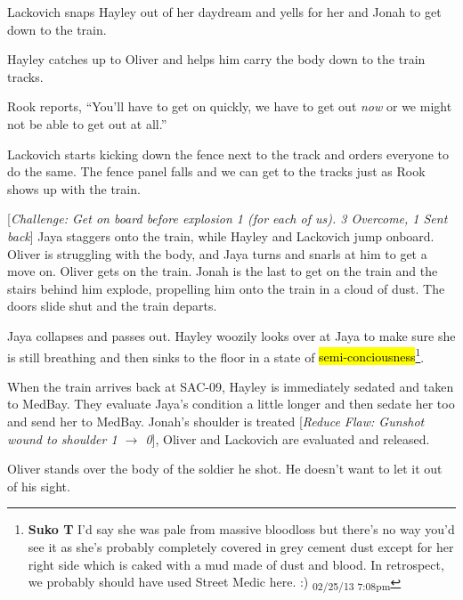 Lackovich snaps Hayley out of her daydream and yells for her and Jonah to get down to the train.



Hayley catches up to Oliver and helps him carry the body down to the train tracks.



Rook reports, ``You'll have to get on quickly, we have to get out \textit{now} or we might not be able to get out at all.''



Lackovich starts kicking down the fence next to the track and orders everyone to do the same.  The fence panel falls and we can get to the tracks just as Rook shows up with the train.



{[}\textit{Challenge: Get on board before explosion 1 (for each of us).  3 Overcome, 1 Sent back}{]}  Jaya staggers onto the train, while Hayley and Lackovich jump onboard.  Oliver is struggling with the body, and Jaya turns and snarls at him to get a move on.  Oliver gets on the train.  Jonah is the last to get on the train and the stairs behind him explode, propelling him onto the train in a cloud of dust.  The doors slide shut and the train departs.



Jaya collapses and passes out. Hayley woozily looks over at Jaya to make sure she is still breathing and then sinks to the floor in a state of \hl{semi-conciousness}\footnote{\textbf{Suko T }I'd say she was pale from massive bloodloss but there's no way you'd see it as she's probably completely covered in grey cement dust except for her right side which is caked with a mud made of dust and blood.  In retrospect, we probably should have used Street Medic here. :) \textsubscript{02/25/13 7:08pm}}.






When the train arrives back at SAC-09, Hayley is immediately sedated and taken to MedBay.  They evaluate Jaya's condition a little longer and then sedate her too and send her to MedBay.  Jonah's shoulder is treated {[}\textit{Reduce Flaw: Gunshot wound to shoulder 1 $\rightarrow$ 0}{]}, Oliver and Lackovich are evaluated and released.



Oliver stands over the body of the soldier he shot. He doesn't want to let it out of his sight.

